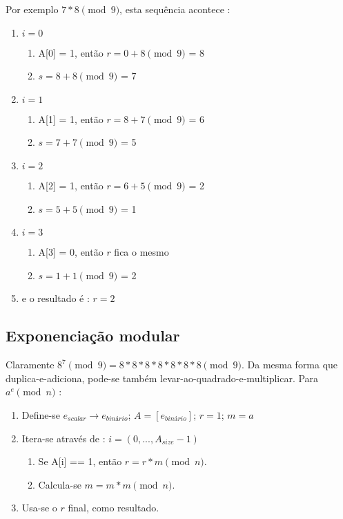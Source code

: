 Por exemplo $7*8 \pmod 9$, esta sequência acontece :
\begin{enumerate}
	\item $i = 0$
	\begin{enumerate}
		\item A[0] = 1, então $r = 0 + 8 \pmod 9$ = 8
		\item $s = 8 + 8 \pmod 9$ = 7
	\end{enumerate}
	\item $i = 1$
	\begin{enumerate}
		\item A[1] = 1, então $r = 8 + 7 \pmod 9$ = 6
		\item $s = 7 + 7 \pmod 9$ = 5
	\end{enumerate}
	\item $i = 2$
	\begin{enumerate}
		\item A[2] = 1, então $r = 6 + 5 \pmod 9$ = 2
		\item $s = 5 + 5 \pmod 9$ = 1
	\end{enumerate}
	\item $i = 3$
	\begin{enumerate}
		\item A[3] = 0, então $r$ fica o mesmo
		\item $s = 1 + 1 \pmod 9$ = 2
	\end{enumerate}
	\item e o resultado é : $r = 2$
\end{enumerate}


\subsection{Exponenciação modular}

Claramente $8^7 \pmod 9 = 8*8*8*8*8*8*8 \pmod 9$. Da mesma forma que duplica-e-adiciona, pode-se também levar-ao-quadrado-e-multiplicar. Para $a^e \pmod{n}$ :
\begin{enumerate}
	\item Define-se $e_{scalar} \rightarrow e_{binário}$; $A = [e_{binário}]$; $r = 1$; $m = a$
	\item Itera-se através de : $i = (0,...,A_{size} - 1)$
	\begin{enumerate}
		\item Se A[i] == 1, então $r = r * m \pmod n$.
		\item Calcula-se $m = m * m \pmod n$.
	\end{enumerate}
	\item Usa-se o $r$ final, como resultado.
\end{enumerate}


